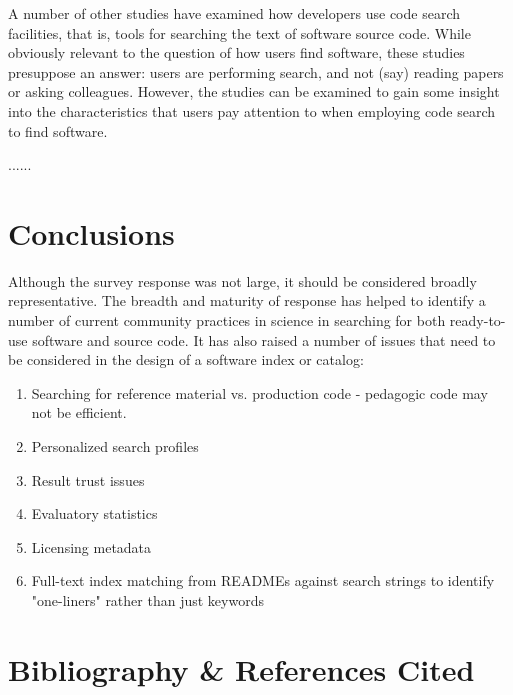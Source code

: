 \documentclass{casicswhitepaper}
\begin{document}
A number of other studies have examined how developers use code search facilities, that is, tools for searching the text of software source code.  While obviously relevant to the question of how users find software, these studies presuppose an answer: users are performing search, and not (say) reading papers or asking colleagues.  However, the studies can be examined to gain some insight into the characteristics that users pay attention to when employing code search to find software.

......




\section{Conclusions}

Although the survey response was not large, it should be considered broadly representative. The breadth and maturity of response has helped to identify a number of current community practices in science in searching for both ready-to-use software and source code. It has also raised a number of issues that need to be considered in the design of a software index or catalog:

\begin{enumerate}
\item Searching for reference material vs. production code - pedagogic code may not be efficient.
\item Personalized search profiles
\item Result trust issues
\item Evaluatory statistics 
\item Licensing metadata
\item Full-text index matching from READMEs against search strings to identify "one-liners" rather than just keywords
\end{enumerate}

\clearpage
\section*{Bibliography \& References Cited}
\renewcommand{\refname}{}               %
\vspace*{-2ex}


\end{document}
